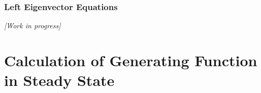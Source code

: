 \documentclass[a4paper,10pt]{article}
\begin{document}
\subsubsection{Left Eigenvector Equations}

\emph{[Work in progress]}


\newpage
\appendix

\section{Calculation of Generating Function in Steady State}
\end{document}
